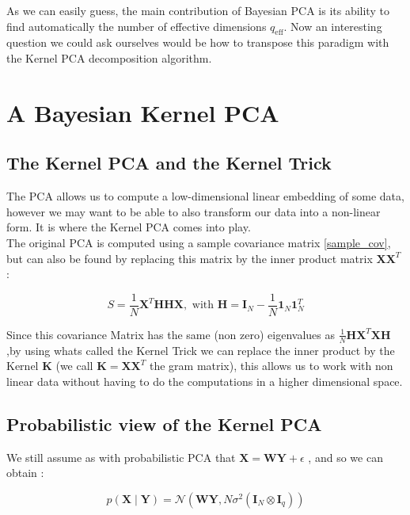 \documentclass{article}
\begin{document}
As we can easily guess, the main contribution of Bayesian PCA is its ability to find automatically the number of effective dimensions $q_{\text{eff}}$. Now an interesting question we could ask ourselves would be how to transpose this paradigm with the Kernel PCA decomposition algorithm.

\section{A Bayesian Kernel PCA}

\subsection{The Kernel PCA and the Kernel Trick}

The PCA allows us to compute a low-dimensional linear embedding of some data, however we may want to be able to also transform our data into a non-linear form. It is where the Kernel PCA comes into play.\\
The original PCA is computed using a sample covariance matrix \ref{sample_cov}, but can also be found by replacing this matrix by the inner product matrix \cite{KevinP.Murphy17} $\mathbf{X} \mathbf{X}^T$ :

$$ S = \frac{1}{N} \mathbf{X}^T \mathbf{H} \mathbf{H} \mathbf{X}, \text{ with }  \mathbf{H} = \mathbf{I}_N -\frac{1}{N} \mathbf{1}_N \mathbf{1}_N^T
$$

Since this covariance Matrix has the same (non zero) eigenvalues as $\frac{1}{N} \mathbf{H}  \mathbf{X}^T \mathbf{X} \mathbf{H}$,by using whats called the Kernel Trick we can replace the inner product by the Kernel $\mathbf{K}$ (we call $\mathbf{K} = \mathbf{X}\mathbf{X}^T$ the gram matrix), this allows us to work with non linear data without having to do the computations in a higher dimensional space.

\subsection{Probabilistic view of the Kernel PCA}


We still assume as with probabilistic PCA that $ \mathbf{X} = \mathbf{W} \mathbf{Y} + \epsilon$ ,  and so we can obtain \cite{pkpca} :

\begin{equation}
    p(\mathbf{X} \mid \mathbf{Y}) = \mathcal{N}(\mathbf{W} \mathbf{Y},N \sigma^2 (\mathbf{I}_N \otimes \mathbf{I}_q ) )  
\end{equation}
\end{document}
